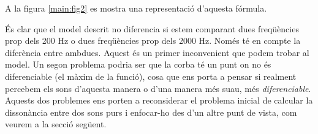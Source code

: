 \documentclass{article}
\theoremstyle{definition}
\newcommand{\0}{\ensuremath{\vb{0}}}
\begin{document}
A la figura \ref{main:fig2} es mostra una representació d'aquesta fórmula.
\begin{center}
    
    \label{main:fig2}
\end{center}
És clar que el model descrit no diferencia si estem comparant dues freqüències prop dels 200 Hz o dues freqüències prop dels 2000 Hz. Només té en compte la diferència entre ambdues. Aquest és un primer inconvenient que podem trobar al model. Un segon problema podria ser que la corba té un punt on no és diferenciable (el màxim de la funció), cosa que ens porta a pensar si realment percebem els sons d'aquesta manera o d'una manera més suau, més \textit{diferenciable}. Aquests dos problemes ens porten a reconsiderar el problema inicial de calcular la dissonància entre dos sons purs i enfocar-ho des d'un altre punt de vista, com veurem a la secció següent.
\end{document}
